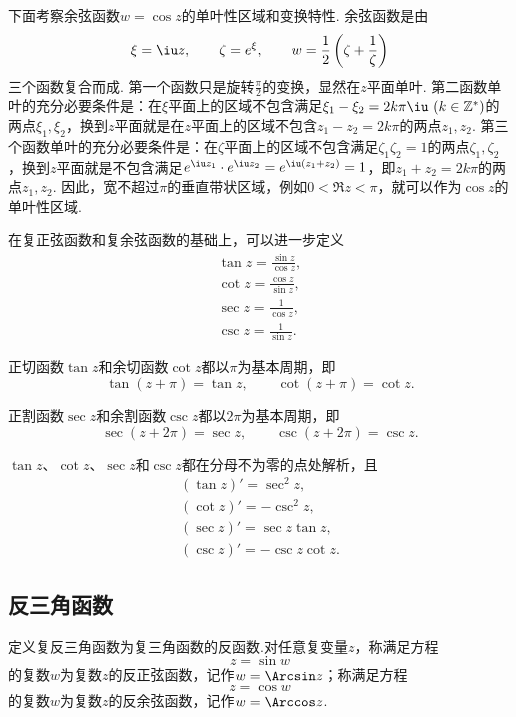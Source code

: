 下面考察余弦函数\(w = \cos z\)的单叶性区域和变换特性.
余弦函数是由\[
\xi = \iu z,
\qquad
\zeta = e^{\xi},
\qquad
w = \frac{1}{2} \left( \zeta + \frac{1}{\zeta} \right)
\]三个函数复合而成.
第一个函数只是旋转\(\frac{\pi}{2}\)的变换，显然在\(z\)平面单叶.
第二函数单叶的充分必要条件是：在\(\xi\)平面上的区域不包含满足\(\xi_1 - \xi_2 = 2k\pi\iu\ (k\in\mathbb{Z}^*)\)的两点\(\xi_1,\xi_2\)，换到\(z\)平面就是在\(z\)平面上的区域不包含\(z_1 - z_2 = 2k\pi\)的两点\(z_1,z_2\).
第三个函数单叶的充分必要条件是：在\(\zeta\)平面上的区域不包含满足\(\zeta_1 \zeta_2 = 1\)的两点\(\zeta_1,\zeta_2\)，换到\(z\)平面就是不包含满足\(e^{\iu z_1} \cdot e^{\iu z_2} = e^{\iu(z_1+z_2)} = 1\)，即\(z_1 + z_2 = 2k\pi\)的两点\(z_1,z_2\).
因此，宽不超过\(\pi\)的垂直带状区域，例如\(0 < \Re z < \pi\)，就可以作为\(\cos z\)的单叶性区域.

\begin{definition}
在复正弦函数和复余弦函数的基础上，可以进一步定义\begin{gather}
\tan z = \frac{\sin z}{\cos z}, \\
\cot z = \frac{\cos z}{\sin z}, \\
\sec z = \frac{1}{\cos z}, \\
\csc z = \frac{1}{\sin z}.
\end{gather}
\end{definition}

\begin{property}
正切函数\(\tan z\)和余切函数\(\cot z\)都以\(\pi\)为基本周期，即\[
\tan(z+\pi) = \tan z,
\qquad
\cot(z+\pi) = \cot z.
\]

正割函数\(\sec z\)和余割函数\(\csc z\)都以\(2\pi\)为基本周期，即\[
\sec(z+2\pi) = \sec z,
\qquad
\csc(z+2\pi) = \csc z.
\]
\end{property}

\begin{property}
\(\tan z\)、\(\cot z\)、\(\sec z\)和\(\csc z\)都在分母不为零的点处解析，且\begin{gather}
(\tan z)' = \sec^2 z, \label{equation:解析函数.正切函数的导数} \\
(\cot z)' = -\csc^2 z, \label{equation:解析函数.余切函数的导数} \\
(\sec z)' = \sec z \tan z, \label{equation:解析函数.正割函数的导数} \\
(\csc z)' = -\csc z \cot z. \label{equation:解析函数.余割函数的导数}
\end{gather}
\end{property}

\subsection{反三角函数}
\begin{definition}
定义复反三角函数为复三角函数的反函数.对任意复变量\(z\)，称满足方程\[
z = \sin w
\]的复数\(w\)为复数\(z\)的反正弦函数，记作\(w = \Arcsin z\)；称满足方程\[
z = \cos w
\]的复数\(w\)为复数\(z\)的反余弦函数，记作\(w = \Arccos z\).
\end{definition}

